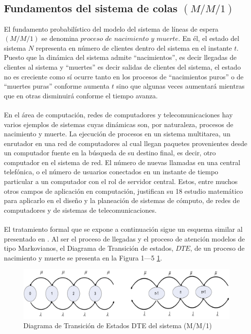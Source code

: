 \subsection{Fundamentos del sistema de colas $(M/M/1)$}
El fundamento probabilístico del modelo del sistema de líneas de espera $(M/M/1)$ se denomina $proceso$ $de$ $nacimiento$ $y$ $muerte$. En él, el estado del sistema $N$ representa en número de clientes dentro del sistema en el instante $t$. Puesto que la dinámica del sistema admite “nacimientos”, es decir llegadas de clientes al sistema y “muertes” es decir salidas de clientes del sistema, el estado no es creciente como sí ocurre tanto en los procesos de “nacimientos puros” o de “muertes puras” conforme aumenta $t$
sino que algunas veces aumentará mientras que en otras disminuirá conforme el tiempo avanza.
\\\\
En el área de computación, redes de computadores y telecomunicaciones hay varios ejemplos de sistemas cuyas dinámicas son, por naturaleza, procesos de nacimiento y muerte. La ejecución de procesos en un sistema multitarea, un enrutador en una red de computadores al cual llegan paquetes
provenientes desde un computador fuente en la búsqueda de su destino final, es decir, otro computador en el sistema de red. El número de nuevas llamadas en una central telefónica, o el número de usuarios conectados en un instante de tiempo particular a un computador con el rol de servidor central. Estos, entre muchos otros campos de aplicación en computación, justifican su 18
estudio matemático para aplicarlo en el diseño y la planeación de sistemas de cómputo, de redes de computadores y de sistemas de telecomunicaciones.
\\\\
El tratamiento formal que se expone a continuación sigue un esquema similar al presentado en \cite{kleinrock1975}. Al ser el proceso de llegadas y el proceso de atención modelos de tipo Markovianos, el Diagrama de Transición de estados, $DTE$, de un proceso de nacimiento y muerte se presenta en la Figura 1—5 \ref{fig:mesh5}.

\begin{figure}[H]
\centering
\includegraphics[width=4.5in]{chapters/chapter3/figures/Figura1-5:DiagramadeTransiciondeEstadosDTEdelsistema.png}
\caption[Diagrama de Transición de Estados DTE del sistema (M/M/1)]{Diagrama de Transición de Estados DTE del sistema (M/M/1)}
\label{fig:mesh5}
\end{figure}

